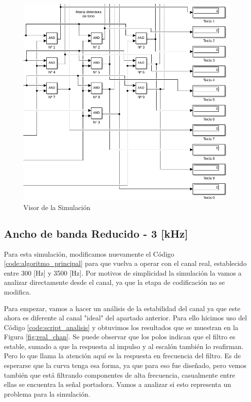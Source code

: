 \begin{figure}[!htb]
  \centering
  \includegraphics[width=400pt]{images/simulacion/extendido/sim.png}
  \caption{Visor de la Simulación}
  \label{fig:sim_sim}
\end{figure}


\subsection{Ancho de banda Reducido - 3 [kHz]}
Para esta simulación, modificamos nuevamente el Código \ref{code:algoritmo_principal} para que vuelva a operar con el canal real, establecido entre 300 [Hz] y 3500 [Hz]. Por motivos de simplicidad la simulación la vamos a analizar directamente desde el canal, ya que la etapa de codificación no se modifica.

Para empezar, vamos a hacer un análisis de la estabilidad del canal ya que este ahora es diferente al canal "ideal" del apartado anterior. Para ello hicimos uso del Código \ref{code:script_analisis} y obtuvimos los resultados que se muestran en la Figura \ref{fig:real_chan}. Se puede observar que los polos indican que el filtro es estable, sumado a que la respuesta al impulso y al escalón también lo reafirman. Pero lo que llama la atención aquí es la respuesta en frecuencia del filtro. Es de esperarse que la curva tenga esa forma, ya que para eso fue diseñado, pero vemos también que está filtrando componentes de alta frecuencia, casualmente entre ellas se encuentra la señal portadora. Vamos a analizar si esto representa un problema para la simulación.

